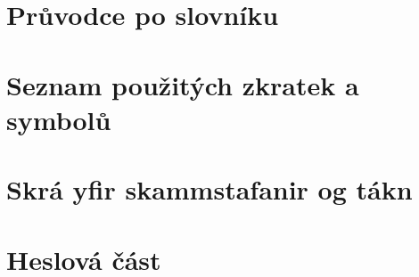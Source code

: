 \chapter{Průvodce po slovníku}         %


\onecolumn


\chapter{Seznam použitých zkratek a symbolů}
\begin{multicols}{2}
\begin{description}%

\end{description}
\end{multicols}

\chapter{Skrá yfir skammstafanir og tákn}
\begin{multicols}{2}
\begin{description}%

\end{description}
\end{multicols}


\chapter{Heslová část}
\thispagestyle{empty}
\clearpage

\cleardoublepage
{}
\pagestyle{dictstyle}


\newcommand*{\alphabet}{%
  a%
  }

